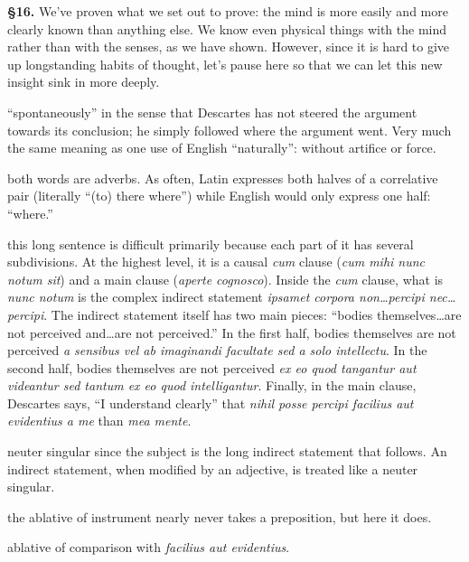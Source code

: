 \textbf{§16.} We've proven what we set out to prove: the mind is more easily and more clearly known than anything else. We know even physical things with the mind rather than with the senses, as we have shown. However, since it is hard to give up longstanding habits of thought, let's pause here so that we can let this new insight sink in more deeply.

 ``spontaneously'' in the sense that Descartes has not steered the argument towards its conclusion; he simply followed where the argument went. Very much the same meaning as one use of English ``naturally'': without artifice or force.

 both words are adverbs. As often, Latin expresses both halves of a correlative pair (literally ``(to) there where'') while English would only express one half: ``where.''

 this long sentence is difficult primarily because each part of it has several subdivisions. At the highest level, it is a causal \textit{cum} clause (\textit{cum mihi nunc notum sit}) and a main clause (\textit{aperte cognosco}). Inside the \textit{cum} clause, what is \textit{nunc notum} is the complex indirect statement \textit{ipsamet corpora non\dots percipi nec\dots percipi}. The indirect statement itself has two main pieces: ``bodies themselves\dots are not perceived and\dots are not perceived.'' In the first half, bodies themselves are not perceived \textit{a sensibus vel ab imaginandi facultate sed a solo intellectu}. In the second half, bodies themselves are not perceived \textit{ex eo quod tangantur aut videantur sed tantum ex eo quod intelligantur}. Finally, in the main clause, Descartes says, ``I understand clearly'' that \textit{nihil posse percipi facilius aut evidentius a me} than \textit{mea mente}.

 neuter singular since the subject is the long indirect statement that follows. An indirect statement, when modified by an adjective, is treated like a neuter singular.

 the ablative of instrument nearly never takes a preposition, but here it does.

 ablative of comparison with \textit{facilius aut evidentius}.

